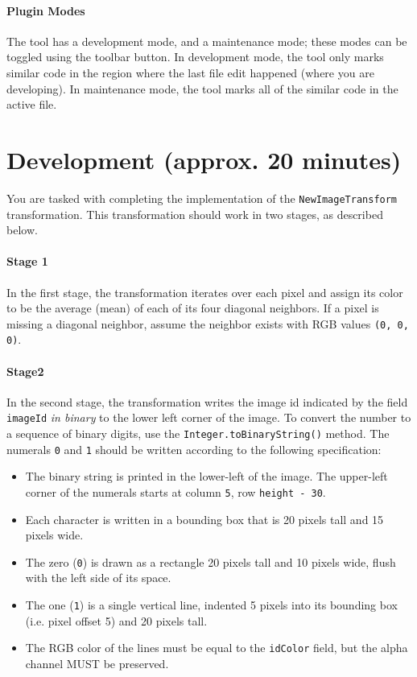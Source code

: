 \documentclass[12pt]{article}
\begin{document}
\paragraph{Plugin Modes}
The tool has a development mode, and a maintenance mode; these modes
can be toggled using the toolbar button. In development mode, the tool only
marks similar code in the region where the last file edit happened
(where you are developing). In maintenance mode, the tool marks all of
the similar code in the active file.

\pagebreak

\section{Development (approx. 20 minutes)}

You are tasked with completing the implementation of the
\verb|NewImageTransform| transformation.  This transformation should
work in two stages, as described below.

\paragraph{Stage 1}
In the first stage, the transformation iterates over each
pixel and assign its color to be the average (mean) of each of its
four diagonal neighbors. If a pixel is missing a diagonal neighbor,
assume the neighbor exists with RGB values \verb|(0, 0, 0)|.

\paragraph{Stage2}
In the second stage, the transformation
writes the image id indicated by the field \verb|imageId| \textit{in binary} to the lower
left corner of the image.  To convert the number to a sequence of binary digits, use the 
\verb|Integer.toBinaryString()| method. The numerals \verb|0|
and \verb|1| should be written according to the following specification:

\begin{itemize}
\item The binary string is printed in the lower-left of the image.
  The upper-left corner of the numerals starts at column \verb|5|, row
  \verb|height - 30|.
\item Each character is written in a bounding box that is 20 pixels
  tall and 15 pixels wide.
\item The zero (\verb|0|) is drawn as a rectangle 20 pixels tall and
  10 pixels wide, flush with the left side of its space.
\item The one (\verb|1|) is a single vertical line, indented 5 pixels
  into its bounding box (i.e. pixel offset 5) and 20 pixels tall.
\item The RGB color of the lines must be equal to the \verb|idColor|
  field, but the alpha channel MUST be preserved.
\end{itemize}
\end{document}
